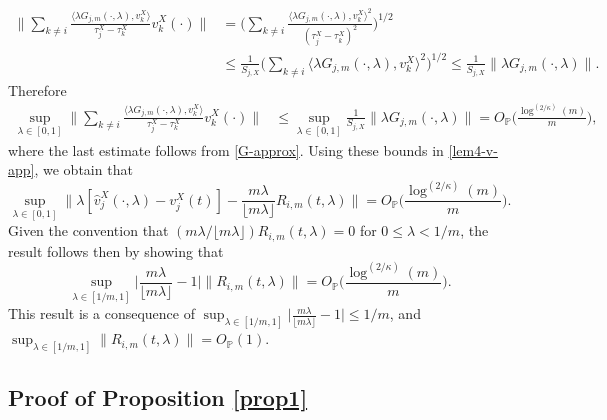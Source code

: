 \documentclass[11pt]{article}
\numberwithin{equation}{section}
\numberwithin{theorem}{section}
\numberwithin{lemma}{section}
\numberwithin{proposition}{section}
\numberwithin{cor}{section}
\numberwithin{definition}{section}
\numberwithin{cons}{section}
\numberwithin{rem}{section}
\numberwithin{exa}{section}
\numberwithin{table}{section}
\numberwithin{figure}{section}
\numberwithin{algo}{section}
\begin{document}
{{\begin{align*}
\Big\|\sum_{k \neq i} \frac{\langle \lambda G_{j,m}(\cdot,\lambda),v^X_k \rangle}{\tau^X_j - \tau^X_k}  v^X_k(\cdot)\Big\| &= \Big( \sum_{k \neq i} \frac{\langle \lambda G_{j,m}(\cdot,\lambda),v^X_k \rangle^2}{(\tau^X_j - \tau^X_k)^2}   \Big)^{1/2} \\
&\le \frac{1}{S_{j,X}} \Big( \sum_{k \neq i} {\langle \lambda G_{j,m}(\cdot,\lambda),v^X_k \rangle^2}   \Big)^{1/2}  \le \frac{1}{S_{j,X}} \|\lambda G_{j,m}(\cdot,\lambda)\|.
\end{align*}
Therefore
\begin{align*}
\sup_{\lambda \in [0,1]} \Big\|\sum_{k \neq i} \frac{\langle \lambda G_{j,m}(\cdot,\lambda),v^X_k \rangle}{\tau^X_j - \tau^X_k}  v^X_k(\cdot)\Big\| & \le  \sup_{\lambda \in [0,1]} \frac{1}{S_{j,X}} \|\lambda G_{j,m}(\cdot,\lambda)\|
 = O_\mathbb{P}\Big(\frac{\log^{(2/\kappa)}(m)}{m} \Big),
\end{align*}
where the last estimate follows from \eqref{G-approx}. Using these bounds in \eqref{lem4-v-app}, we obtain that
$$
\sup_{\lambda \in [0,1]} \Big\|  \lambda[\hat{v}^X_j(\cdot,\lambda) - v^X_j(t)] - \frac{m\lambda}{\lfloor m \lambda \rfloor} R_{i,m}(t,\lambda)\Big\| = O_\mathbb{P}\Big(\frac{\log^{(2/\kappa)}(m)}{m} \Big).
$$
Given the convention that $({m\lambda}/{\lfloor m \lambda \rfloor}) R_{i,m}(t,\lambda)=0$ for $0\le \lambda < 1/m$, the result follows then by showing that
$$
\sup_{\lambda \in [1/m,1]}  \Big|\frac{m\lambda}{\lfloor m \lambda \rfloor}-1\Big|\Big\| R_{i,m}(t,\lambda)  \Big\|= O_\mathbb{P}\Big(\frac{\log^{(2/\kappa)}(m)}{m} \Big).
$$
This result is a consequence of $\sup_{\lambda \in [1/m,1]}  \big|\frac{m\lambda}{\lfloor m \lambda \rfloor}-1\big| \le 1/m$, and $\sup_{\lambda \in [1/m,1]}\| R_{i,m}(t,\lambda) \|=O_\mathbb{P}(1)$.


\subsection{Proof of Proposition \ref{prop1}} \label{appendix2}

}}
\end{document}

